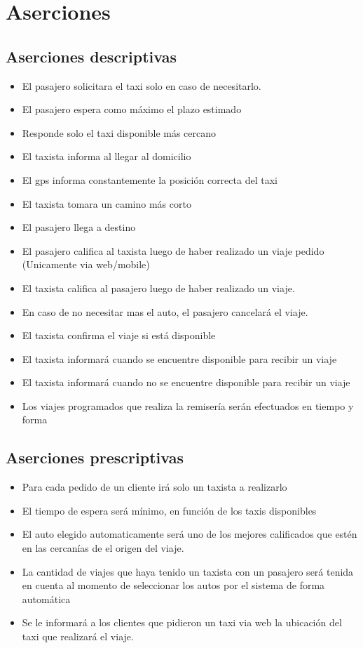 \documentclass[a4paper]{artcle}
\begin{document}
\section{Aserciones}

\subsection{Aserciones descriptivas}

\begin{itemize}

\item El pasajero solicitara el taxi solo en caso de necesitarlo.
\item El pasajero espera como m\'aximo el plazo estimado
\item Responde solo el taxi disponible m\'as cercano
\item El taxista informa al llegar al domicilio
\item El gps informa constantemente la posici\'on correcta del taxi
\item El taxista tomara un camino m\'as corto
\item El pasajero llega a destino
\item El pasajero califica al taxista luego de haber realizado un viaje pedido (Unicamente via web/mobile)
\item El taxista califica al pasajero luego de haber realizado un viaje.
\item En caso de no necesitar mas el auto, el pasajero cancelar\'a el viaje.
\item El taxista confirma el viaje si est\'a disponible
\item El taxista informar\'a cuando se encuentre disponible para recibir un viaje
\item El taxista informar\'a cuando no se encuentre disponible para recibir un viaje
\item Los viajes programados que realiza la remiser\'ia ser\'an efectuados en tiempo y forma
\end{itemize}


\subsection{Aserciones prescriptivas}

\begin{itemize}
\item Para cada pedido de un cliente ir\'a solo un taxista a realizarlo
\item El tiempo de espera ser\'a m\'inimo, en funci\'on de los taxis disponibles
\item El auto elegido automaticamente ser\'a uno de los mejores calificados que est\'en en las cercan\'ias de el origen del viaje.
\item La cantidad de viajes que haya tenido un taxista con un pasajero ser\'a tenida en cuenta al momento de seleccionar los autos por el sistema de forma autom\'atica
\item Se le informar\'a a los clientes que pidieron un taxi via web la ubicaci\'on del taxi que realizar\'a el viaje.
 
\end{itemize}
\end{document}
